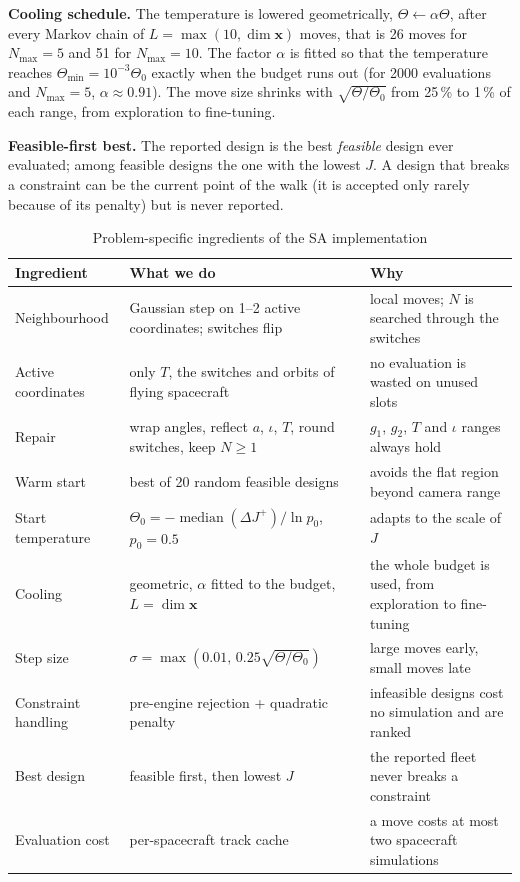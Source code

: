 \textbf{Cooling schedule.} The temperature is lowered geometrically, $\Theta\leftarrow\alpha\Theta$, after
every Markov chain of $L=\max(10,\dim\mathbf{x})$ moves, that is 26 moves for $N_{\max}=5$ and 51 for
$N_{\max}=10$. The factor $\alpha$ is fitted so that
the temperature reaches $\Theta_{\min}=10^{-3}\Theta_0$ exactly when the budget runs out (for 2000
evaluations and $N_{\max}=5$, $\alpha\approx0.91$). The move size shrinks with
$\sqrt{\Theta/\Theta_0}$ from 25\,\% to 1\,\% of each range, from exploration to fine-tuning.

\textbf{Feasible-first best.} The reported design is the best \emph{feasible} design ever evaluated;
among feasible designs the one with the lowest $J$. A design that breaks a constraint can be the
current point of the walk (it is accepted only rarely because of its penalty) but is never
reported.

\begin{table}[htbp]
\centering
\caption{Problem-specific ingredients of the SA implementation}
\label{tab:saspecific}
\footnotesize
\begin{tabularx}{\textwidth}{@{}p{2.5cm}Xp{4.2cm}@{}}
\toprule
Ingredient & What we do & Why \\
\midrule
Neighbourhood & Gaussian step on 1--2 active coordinates; switches flip & local moves; $N$ is searched through the switches \\
Active coordinates & only $T$, the switches and orbits of flying spacecraft & no evaluation is wasted on unused slots \\
Repair & wrap angles, reflect $a$, $\iota$, $T$, round switches, keep $N\ge1$ & $g_1$, $g_2$, $T$ and $\iota$ ranges always hold \\
Warm start & best of 20 random feasible designs & avoids the flat region beyond camera range \\
Start temperature & $\Theta_0=-\operatorname{median}(\Delta J^{+})/\ln p_0$, $p_0=0.5$ & adapts to the scale of $J$ \\
Cooling & geometric, $\alpha$ fitted to the budget, $L=\dim\mathbf{x}$ & the whole budget is used, from exploration to fine-tuning \\
Step size & $\sigma=\max(0.01,\,0.25\sqrt{\Theta/\Theta_0})$ & large moves early, small moves late \\
Constraint handling & pre-engine rejection + quadratic penalty & infeasible designs cost no simulation and are ranked \\
Best design & feasible first, then lowest $J$ & the reported fleet never breaks a constraint \\
Evaluation cost & per-spacecraft track cache & a move costs at most two spacecraft simulations \\
\bottomrule
\end{tabularx}
\end{table}

